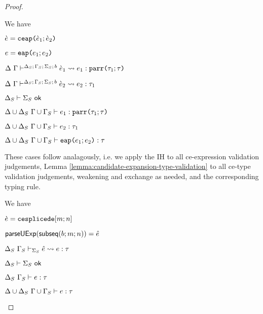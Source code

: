 \begin{proof}
\begin{byCases}
\item[\text{(\ref{rule:cvalidE-U-ap})}] We have
\begin{pfsteps*}
  \item $\grave{e}=\texttt{ceap}\texttt{(}\grave{e}_1; \grave{e}_2\texttt{)}$ 
  \item $e=\texttt{eap}\texttt{(}e_1; e_2\texttt{)}$ 
  \item $\Delta~\Gamma\vdash^{\Delta_S;\,\Gamma_S;\,\Sigma_S;\,b} \grave{e}_1 \leadsto e_1 : \texttt{parr}\texttt{(}\tau_1; \tau\texttt{)}$  
  \item $\Delta~\Gamma\vdash^{\Delta_S;\,\Gamma_S;\,\Sigma_S;\,b} \grave{e}_2 \leadsto e_2 : \tau_1$  
  \item $\Delta_S \vdash \Sigma_S~\mathsf{ok}$  
  \item ${\Delta}\cup{\Delta_S}~{\Gamma}\cup{\Gamma_S} \vdash e_1 : \texttt{parr}\texttt{(}\tau_1; \tau\texttt{)}$  
  \item ${\Delta}\cup{\Delta_S}~{\Gamma}\cup{\Gamma_S} \vdash e_2 : \tau_1$  
  \item ${\Delta}\cup{\Delta_S}~{\Gamma}\cup{\Gamma_S} \vdash \texttt{eap}\texttt{(}e_1; e_2\texttt{)} : \tau$ 
\end{pfsteps*}
\resetpfcounter

\item[{\text{(\ref{rule:cvalidE-U-tlam})}}~\text{through}~{\text{(\ref{rule:cvalidE-U-case})}}] These cases follow analagously, i.e. we apply the IH to all ce-expression validation judgements, Lemma \ref{lemma:candidate-expansion-type-validation} to all ce-type validation judgements, weakening and exchange as needed, and the corresponding typing rule.
\\

\item[\text{(\ref{rule:cvalidE-U-splicede})}] We have
\begin{pfsteps*}
  \item $\grave{e}=\texttt{cesplicede}[m; n]$ 
  \item $\mathsf{parseUExp}(\mathsf{subseq}(b; m; n))={\hat e}$ 
  \item $\Delta_S~\Gamma_S \vdash_{\Sigma_S} {\hat e} \leadsto e : \tau$  
  \item $\Delta_S \vdash \Sigma_S~\mathsf{ok}$  
  \item $\Delta_S~\Gamma_S \vdash e : \tau$  
  \item ${\Delta}\cup{\Delta_S}~{\Gamma}\cup{\Gamma_S} \vdash e : \tau$ 
\end{pfsteps*}
\resetpfcounter
\end{byCases}


\end{proof}
